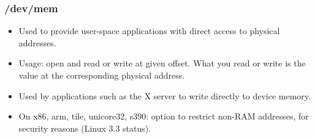 \begin{frame}
  \frametitle{/dev/mem}
  \begin{itemize}
  \item Used to provide user-space applications with direct access to
    physical addresses.
  \item Usage: open  and read or write at given offset.
    What you read or write is the value at the corresponding physical
    address.
  \item Used by applications such as the X server to write directly to
    device memory.
  \item On x86, arm, tile, unicore32, s390:
     option to restrict 
    non-RAM addresses, for security reasons (Linux 3.3 status).
\end{itemize}
\end{frame}
